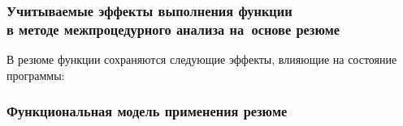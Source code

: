 \documentclass[hyperref={pdfpagelabels=false},10pt,gray]{beamer}
\begin{document}

\begin{frame}
\frametitle{Учитываемые эффекты выполнения функции\\в методе межпроцедурного анализа на~основе резюме}
В резюме функции сохраняются следующие эффекты, влияющие на состояние программы:
\begin{figure}[h]
\end{figure}
\end{frame}

\begin{frame}
\frametitle{Функциональная модель применения резюме}
\begin{figure}[h]
\end{figure}
\end{frame}
\end{document}

